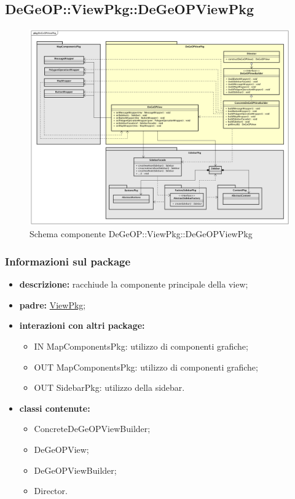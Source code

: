 \subsection{DeGeOP::ViewPkg::DeGeOPViewPkg}
\label{pkg::DeGeOPViewPkg}
\begin{figure}[H]
	\centering
	\includegraphics[width=\textwidth]{img/PkgDiagram/STDeGeOPViewPkg.png}
	\caption{Schema componente DeGeOP::ViewPkg::DeGeOPViewPkg}
\end{figure}
\subsubsection{Informazioni sul package}
\begin{itemize}
	\item \textbf{descrizione:} racchiude la componente principale della view;
	\item \textbf{padre:} \hyperref[pkg::ViewPkg]{ViewPkg};
	\item \textbf{interazioni con altri package:} 
	\begin{itemize}
		\item IN MapComponentsPkg: utilizzo di componenti grafiche;
		\item OUT MapComponentsPkg: utilizzo di componenti grafiche;
		\item OUT SidebarPkg: utilizzo della sidebar.
	\end{itemize}
	\item \textbf{classi contenute:}
	\begin{itemize}
		\item ConcreteDeGeOPViewBuilder;
		\item DeGeOPView;
		\item DeGeOPViewBuilder;
		\item Director.
	\end{itemize}
\end{itemize}
